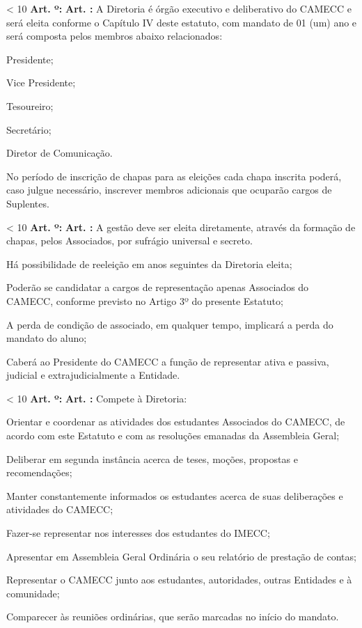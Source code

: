 \documentclass[capitulo]{br-lex}
\newcounter{chap}
\newcounter{sec}
\newcounter{art}
\renewcommand{\artigo}{
    \ifnum\value{art} < 10
        \textbf{Art. \arabic{art}º:}
    \else
        \textbf{Art. \arabic{art}:}
    \fi
    \stepcounter{art}
    \setcounter{inciso}{0}
    \setcounter{paragrafo}{0}
}
\begin{document}
\artigo A Diretoria é órgão executivo e deliberativo do CAMECC e será eleita conforme o Capítulo IV deste estatuto, com mandato de 01 (um) ano e será composta pelos membros abaixo relacionados:

\inciso Presidente;

\inciso Vice Presidente;

\inciso Tesoureiro;

\inciso Secretário;

\inciso Diretor de Comunicação.

\paragrafounico No período de inscrição de chapas para as eleições cada chapa inscrita poderá, caso julgue necessário, inscrever membros adicionais que ocuparão cargos de Suplentes.

\artigo A gestão deve ser eleita diretamente, através da formação de chapas, pelos Associados, por sufrágio universal e secreto.

\paragrafo Há possibilidade de reeleição em anos seguintes da Diretoria eleita;

\paragrafo Poderão se candidatar a cargos de representação apenas Associados do CAMECC, conforme previsto no Artigo 3º do presente Estatuto;

\paragrafo A perda de condição de associado, em qualquer tempo, implicará a perda do mandato do aluno;

\paragrafo Caberá ao Presidente do CAMECC a função de representar ativa e passiva, judicial e extrajudicialmente a Entidade.

\artigo Compete à Diretoria:

\inciso Orientar e coordenar as atividades dos estudantes Associados do CAMECC, de acordo com este Estatuto e com as resoluções emanadas da Assembleia Geral;

\inciso Deliberar em segunda instância acerca de teses, moções, propostas e recomendações;

\inciso Manter constantemente informados os estudantes acerca de suas deliberações e atividades do CAMECC;

\inciso Fazer-se representar nos interesses dos estudantes do IMECC;

\inciso Apresentar em Assembleia Geral Ordinária o seu relatório de prestação de contas;

\inciso Representar o CAMECC junto aos estudantes, autoridades, outras Entidades e à comunidade;

\inciso Comparecer às reuniões ordinárias, que serão marcadas no início do mandato.
\end{document}
